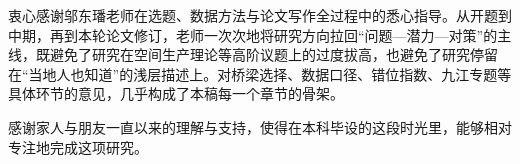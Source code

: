 
\begin{acknowledgements}
衷心感谢邬东璠老师在选题、数据方法与论文写作全过程中的悉心指导。从开题到中期，再到本轮论文修订，老师一次次地将研究方向拉回``问题---潜力---对策''的主线，既避免了研究在空间生产理论等高阶议题上的过度拔高，也避免了研究停留在``当地人也知道''的浅层描述上。对桥梁选择、数据口径、错位指数、九江专题等具体环节的意见，几乎构成了本稿每一个章节的骨架。

感谢家人与朋友一直以来的理解与支持，使得在本科毕设的这段时光里，能够相对专注地完成这项研究。
\end{acknowledgements}
